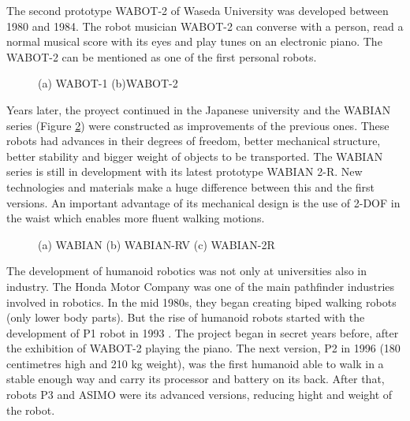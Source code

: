 The second prototype WABOT-2 of Waseda University was developed between 1980 and 1984. The robot musician WABOT-2 can converse with a person, read a normal musical score with its eyes and play tunes on an electronic piano. The WABOT-2 can be mentioned as one of the first personal robots.

\begin{figure}[!hbt]
\centering 
{}\hspace{10mm}
\caption{(a) WABOT-1 (b)WABOT-2}
\label{fig:wabot}
\end{figure}

Years later, the proyect continued in the Japanese university and the WABIAN series (Figure \ref{fig:wabian}) were constructed as improvements of the previous ones. These robots had advances in their degrees of freedom, better mechanical structure, better stability and bigger weight of objects to be transported. The WABIAN series is still in development with its latest prototype WABIAN 2-R. New technologies and materials make a huge difference between this and the first versions. An important advantage of its mechanical design is the use of 2-DOF in the waist which enables more fluent walking motions. 

\begin{figure}[!hbt]
\centering 
{}\hspace{10mm}
\hspace{10mm}
\caption{(a) WABIAN (b) WABIAN-RV (c) WABIAN-2R }
\label{fig:wabian}
\end{figure}

The development of humanoid robotics was not only at universities also in industry. The Honda Motor Company was one of the main pathfinder industries involved in robotics. In the mid 1980s, they began creating biped walking robots (only lower body parts). But the rise of humanoid robots started with the development of P1 robot in 1993 \cite{Kaj2005}. The project began in secret years before, after the exhibition of WABOT-2 playing the piano. The next version, P2 in 1996 (180 centimetres high and 210 kg weight), was the first humanoid able to walk in a stable enough way and carry its processor and battery on its back. After that, robots P3 and ASIMO were its advanced versions, reducing hight and weight of the robot.


